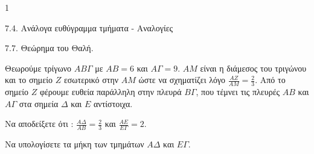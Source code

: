 \begin{ylh}{1}
    \item 7.4. Ανάλογα ευθύγραμμα τμήματα - Αναλογίες
    \item 7.7. Θεώρημα του Θαλή.
\end{ylh}
\begin{figure}
    \centering
\end{figure}

Θεωρούμε τρίγωνο $AB\Gamma$ με $AB=6$ και $A\Gamma=9$. $AM$ είναι η διάμεσος του τριγώνου και το σημείο $Z$ εσωτερικό στην $AM$ ώστε να σχηματίζει λόγο $\frac{AZ}{AM} = \frac{2}{3}$. Από το σημείο $Z$ φέρουμε ευθεία παράλληλη στην πλευρά $B\Gamma$, που τέμνει τις πλευρές $AB$ και $A\Gamma$ στα σημεία $\Delta$ και $E$ αντίστοιχα.

\begin{alist}
    \item Να αποδείξετε ότι : $\frac{A\Delta}{AB} = \frac{2}{3}$ και $\frac{AE}{E\Gamma} = 2$. 
    \item Να υπολογίσετε τα μήκη των τμημάτων $A\Delta$ και $E\Gamma$. 
\end{alist}